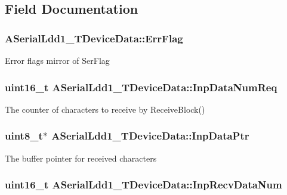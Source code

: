 \subsection{Field Documentation}
\hypertarget{struct_a_serial_ldd1___t_device_data_affbbfe6e7ba079ce255673d47d590070}{
\subsubsection[{Err\-Flag}]{ A\-Serial\-Ldd1\-\_\-\-T\-Device\-Data\-::\-Err\-Flag}}\label{struct_a_serial_ldd1___t_device_data_affbbfe6e7ba079ce255673d47d590070}
Error flags mirror of Ser\-Flag \hypertarget{struct_a_serial_ldd1___t_device_data_adef27888586bb5b013c747537f585ad4}{
\subsubsection[{Inp\-Data\-Num\-Req}]{\setlength{\rightskip}{0pt plus 5cm}uint16\-\_\-t A\-Serial\-Ldd1\-\_\-\-T\-Device\-Data\-::\-Inp\-Data\-Num\-Req}}\label{struct_a_serial_ldd1___t_device_data_adef27888586bb5b013c747537f585ad4}
The counter of characters to receive by Receive\-Block() \hypertarget{struct_a_serial_ldd1___t_device_data_ae08af57044e4ad054cddeff271e52826}{
\subsubsection[{Inp\-Data\-Ptr}]{\setlength{\rightskip}{0pt plus 5cm}uint8\-\_\-t$\ast$ A\-Serial\-Ldd1\-\_\-\-T\-Device\-Data\-::\-Inp\-Data\-Ptr}}\label{struct_a_serial_ldd1___t_device_data_ae08af57044e4ad054cddeff271e52826}
The buffer pointer for received characters \hypertarget{struct_a_serial_ldd1___t_device_data_ae54e8bc2a6f1560a186cf4921de12747}{
\subsubsection[{Inp\-Recv\-Data\-Num}]{\setlength{\rightskip}{0pt plus 5cm}uint16\-\_\-t A\-Serial\-Ldd1\-\_\-\-T\-Device\-Data\-::\-Inp\-Recv\-Data\-Num}}\label{struct_a_serial_ldd1___t_device_data_ae54e8bc2a6f1560a186cf4921de12747}
